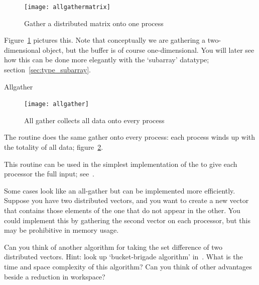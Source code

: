 \begin{figure}[ht]
  \texttt{[image: allgathermatrix]}
  \caption{Gather a distributed matrix onto one process}
  \label{fig:allgathermatrix}
\end{figure}

Figure~\ref{fig:allgathermatrix} pictures this. Note that conceptually
we are gathering a two-dimensional object, but the buffer is of course
one-dimensional. You will later see how this can be done more
elegantly with the `subarray' datatype; section~\ref{sec:type_subarray}.

 {Allgather}

\begin{figure}[ht]
  \texttt{[image: allgather]}
  \caption{All gather collects all data onto every process}
  \label{fig:allgather}
\end{figure}

The  routine does the same gather onto
every process: each process winds up with the totality of all data;
figure~\ref{fig:allgather}.
%

This routine can be used in the simplest implementation of the 
%
 to give each processor the
full input; see~.

Some cases look like an all-gather but can be implemented more
efficiently. Suppose you have two distributed vectors, and you want to
create a new vector that contains those elements of the one that do
not appear in the other. You could implement this by gathering the
second vector on each processor, but this may be prohibitive in memory
usage.

\begin{exercise}
  Can you think of another algorithm for taking the set difference of
  two distributed vectors. Hint: look up `bucket-brigade algorithm'
  in~\cite{Eijkhout:IHPSClulu}. What is the time and space complexity
  of this algorithm? Can you think of other advantages beside a
  reduction in workspace?
\end{exercise}
